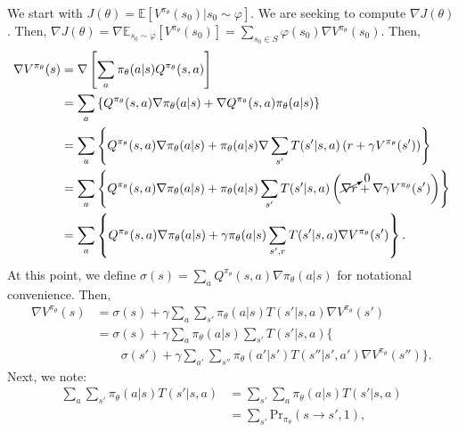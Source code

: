 \documentclass[11pt]{article}
\begin{document}
\begin{enumerate}
        We start with $J(\theta)= \mathbb{E}\left[ V^{\pi_{\theta}}(s_0) | s_0 \sim \varphi \right]$.
        We are seeking to compute $\nabla J(\theta)$.
        Then, $\nabla J(\theta) = \nabla \mathbb{E}_{s_0 \sim \varphi}[V^{\pi_{\theta}} (s_0)] = \sum_{s_0 \in S} \varphi(s_0) \nabla V^{\pi_{\theta}}(s_0)$.
        Then,
        \begin{align*}
            \nabla V^{\pi_{\theta}}(s) &= \nabla \left[  \sum_{a} \pi_{\theta}(a | s) Q^{\pi_{\theta}} (s, a) \right]  \\
                                       &= \sum_{a} \left\{ Q^{\pi_{\theta}}(s,a) \nabla \pi_{\theta}(a | s) + \nabla Q^{\pi_{\theta}} (s, a) \pi_{\theta} (a | s) \right\}\\
                                       &= \sum_{a} \left\{ Q^{\pi_{\theta}} (s,a) \nabla \pi_{\theta} (a | s) + \pi_{\theta} ( a | s)\nabla \sum_{s'} T(s' | s, a) \left( r + \gamma V^{\pi_{\theta}}(s')  \right)  \right\}  \\
                                       &= \sum_{a} \left\{ Q^{\pi_{\theta}} (s,a) \nabla \pi_{\theta} (a | s) + \pi_{\theta} ( a | s) \sum_{s'} T(s' | s, a) \left( \cancelto{0}{\nabla r} + \nabla \gamma V^{\pi_{\theta}}(s')  \right)  \right\}  \\
                                       &= \sum_{a} \left\{ Q^{\pi_{\theta}} (s,a) \nabla \pi_{\theta} (a | s) + \gamma \pi_{\theta} ( a | s) \sum_{s', r} T(s' | s, a) \nabla V^{\pi_{\theta}}(s')  \right\}
        .\end{align*}
        At this point, we define $\sigma(s) = \sum_{a} Q^{\pi_{\theta}}(s, a) \nabla \pi_{\theta} (a | s)$ for notational convenience.
        Then,
        \begin{align*}
            \nabla V^{\pi_{\theta}} (s)  &=  \sigma(s) + \gamma \sum_{a} \sum_{s'}  \pi_{\theta}(a | s) T(s' | s, a) \nabla V^{\pi_{\theta}} (s') \\
            &=  \sigma(s) + \gamma \sum_{a} \pi_{\theta}(a | s) \sum_{s'} T(s' | s, a)  \bigg\{ \\
            & \quad \quad \sigma(s') +  \gamma \sum_{a'} \sum_{s''} \pi_{\theta} (a' | s') T(s'' | s', a') \nabla V^{\pi_{\theta}} (s'')
            \bigg\}
        .\end{align*}
        Next, we note:
        \begin{align*}
            \sum_{a} \sum_{s'} \pi_{\theta} (a | s) T(s' | s, a) &= \sum_{s'} \sum_{a} \pi_{\theta} (a | s) T(s' | s, a)\\
            &= \sum_{s'} \text{Pr}_{\pi_{\theta}}(s \to s', 1),

\end{align*}
\end{enumerate}
\end{document}
